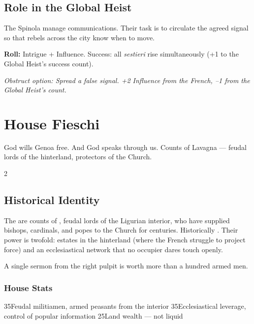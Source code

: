 \section{Role in the Global Heist}

The Spinola manage communications. Their task is to circulate the agreed
signal so that rebels across the city know when to move.

\textbf{Roll:} Intrigue + Influence. Success: all \textit{sestieri} rise
simultaneously (+1 to the Global Heist's success count).

\textit{Obstruct option: Spread a false signal. +2 Influence from the French,
--1 from the Global Heist's count.}

\chapter{House Fieschi}
\label{ch:fieschi}


%
  {God wills Genoa free. And God speaks through us.}%
  {Counts of Lavagna --- feudal lords of the hinterland, protectors of the Church.}

\begin{multicols}{2}

\section{Historical Identity}

The  are counts of , feudal lords of the Ligurian
interior, who have supplied bishops, cardinals, and popes to the Church for
centuries. Historically . Their power is twofold: estates in
the hinterland (where the French struggle to project force) and an
ecclesiastical network that no occupier dares touch openly.

A single sermon from the right pulpit is worth more than a hundred armed men.

\columnbreak

\subsection{House Stats}

    {3}{5}{Feudal militiamen, armed peasants from the interior}
 {3}{5}{Ecclesiastical leverage, control of popular information}
 {2}{5}{Land wealth --- not liquid}

\end{multicols}

